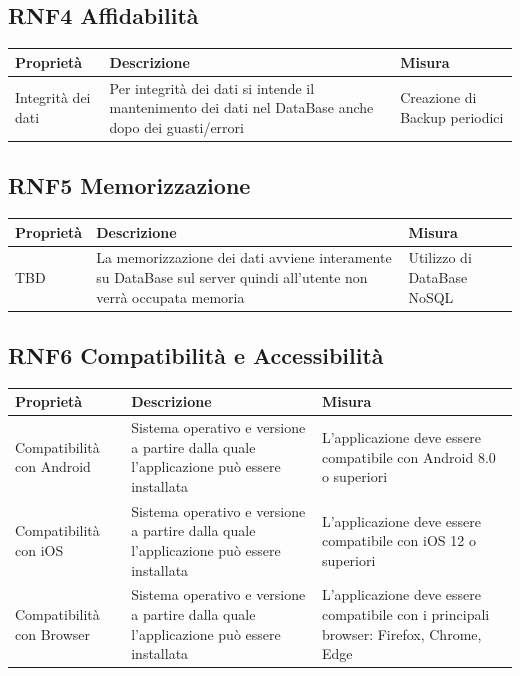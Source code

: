 \documentclass{article}
\begin{document}
\subsection{RNF4 Affidabilità}
\begin{center}
    \begin{longtable}{|p{4cm}|p{8cm}|p{4cm}|}
        \hline
        Proprietà          & Descrizione                                                                                          & Misura                        \\
        \hline
        Integrità dei dati & Per integrità dei dati si intende il mantenimento dei dati nel DataBase anche dopo dei guasti/errori & Creazione di Backup periodici \\
        \hline
    \end{longtable}
\end{center}
\subsection{RNF5 Memorizzazione}
\begin{center}
    \begin{longtable}{|p{4cm}|p{8cm}|p{4cm}|}
        \hline
        Proprietà & Descrizione                                                                                                        & Misura                     \\
        \hline
        TBD       & La memorizzazione dei dati avviene interamente su DataBase sul server quindi all'utente non verrà occupata memoria & Utilizzo di DataBase NoSQL \\
        \hline
    \end{longtable}
\end{center}
\subsection{RNF6 Compatibilità e Accessibilità}
\begin{center}
    \begin{longtable}{|p{4cm}|p{8cm}|p{4cm}|}
        \hline
        Proprietà                 & Descrizione                                                                             & Misura                                                                                 \\
        \hline
        Compatibilità con Android & Sistema operativo e versione a partire dalla quale l'applicazione può essere installata & L'applicazione deve essere compatibile con Android 8.0 o superiori                     \\
        \hline
        Compatibilità con iOS     & Sistema operativo e versione a partire dalla quale l'applicazione può essere installata & L'applicazione deve essere compatibile con iOS 12 o superiori                          \\
        \hline
        Compatibilità con Browser & Sistema operativo e versione a partire dalla quale l'applicazione può essere installata & L'applicazione deve essere compatibile con i principali browser: Firefox, Chrome, Edge \\
        \hline
    \end{longtable}
\end{center}
\end{document}

